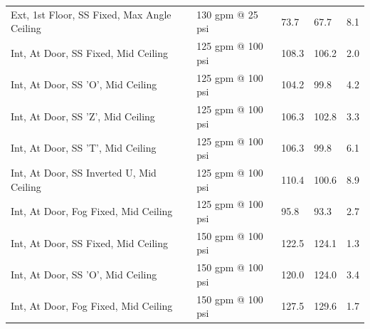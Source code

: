 \documentclass{book}
\begin{document}
\begin{table}[]
\begin{tabular}{lllll}
Ext, 1st Floor, SS Fixed, Max Angle Ceiling           & 130 gpm @ 25 psi                    & 73.7                                   & 67.7                                    & 8.1                                     \\
Int, At Door, SS Fixed, Mid Ceiling                   & 125 gpm @ 100 psi                   & 108.3                                  & 106.2                                   & 2.0                                     \\
Int, At Door, SS 'O', Mid Ceiling                     & 125 gpm @ 100 psi                   & 104.2                                  & 99.8                                    & 4.2                                     \\
Int, At Door, SS 'Z', Mid Ceiling                     & 125 gpm @ 100 psi                   & 106.3                                  & 102.8                                   & 3.3                                     \\
Int, At Door, SS 'T', Mid Ceiling                     & 125 gpm @ 100 psi                   & 106.3                                  & 99.8                                    & 6.1                                     \\
Int, At Door, SS Inverted U, Mid Ceiling              & 125 gpm @ 100 psi                   & 110.4                                  & 100.6                                   & 8.9                                     \\
Int, At Door, Fog Fixed, Mid Ceiling                  & 125 gpm @ 100 psi                   & 95.8                                   & 93.3                                    & 2.7                                     \\
Int, At Door, SS Fixed, Mid Ceiling                   & 150 gpm @ 100 psi                   & 122.5                                  & 124.1                                   & 1.3                                     \\
Int, At Door, SS 'O', Mid Ceiling                     & 150 gpm @ 100 psi                   & 120.0                                  & 124.0                                   & 3.4                                     \\
Int, At Door, Fog Fixed, Mid Ceiling                  & 150 gpm @ 100 psi                   & 127.5                                  & 129.6                                   & 1.7                                     \\

\end{tabular}
\end{table}
\end{document}
